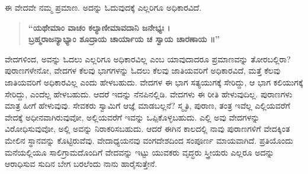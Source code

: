 ಈ ವೇದವೇ ನಮ್ಮ ಪ್ರಮಾಣ. ಅದನ್ನು ಓದುವುದಕ್ಕೆ ಎಲ್ಲರಿಗೂ ಅಧಿಕಾರವಿದೆ.

\vspace{-0.3cm}

\begin{verse}
\textbf{“ಯಥೇಮಾಂ ವಾಚಂ ಕಲ್ಯಾಣೀಮಾವದಾನಿ ಜನೇಭ್ಯಃ ।} \\
\textbf{ಬ್ರಹ್ಮರಾಜನ್ಯಾಭ್ಯಾಂ ಶೂದ್ರಾಯ ಚಾರ್ಯಾಯ ಚ ಸ್ವಾಯ ಚಾರಣಾಯ ॥”} 
\end{verse}

\vspace{-0.3cm}

{}



ವೇದಗಳಿಂದ, ಅವನ್ನು ಓದಲು ಎಲ್ಲರಿಗೂ ಅಧಿಕಾರವಿಲ್ಲ ಎಂಬ ಯಾವುದಾದರೂ ಪ್ರಮಾಣವನ್ನು ತೋರಬಲ್ಲಿರಾ? ಪುರಾಣಗಳೇನೋ, ವೇದಗಳ ಕೆಲವು ಭಾಗಗಳನ್ನು ಓದಲು ಕೆಲವು ಜಾತಿಯವರಿಗೆ ಅಧಿಕಾರವಿದೆ, ಮತ್ತೆ ಕೆಲವು ಜಾತಿಯವರಿಗೆ ಅಧಿಕಾರವಿಲ್ಲ ಎಂದು ಹೇಳಬಹುದು. ವೇದಗಳ ಈ ಭಾಗ ಸತ್ಯಯುಗಕ್ಕೆ ಸೇರಿದ್ದು, ಆ ಭಾಗ ಕಲಿಯುಗಕ್ಕೆ ಸೇರಿದ್ದು, ಎಂದೆಲ್ಲ ಹೇಳಬಹುದು. ಆದರೆ ಇದನ್ನು ನೆನಪಿನಲ್ಲಿಡಿ. ವೇದಗಳು ಈ ರೀತಿ ಹೇಳುವುದಿಲ್ಲ. ಪುರಾಣಗಳು ಮಾತ್ರ ಹೀಗೆ ಹೇಳುವುವು. ಸೇವಕರು ಸ್ವಾಮಿಗೆ ಆಜ್ಞೆ ಮಾಡಬಲ್ಲನೆ? ಸ್ಮೃತಿ, ಪುರಾಣ, ತಂತ್ರ ಇವೆಲ್ಲ ಎಲ್ಲಿಯವರೆಗೆ ವೇದಕ್ಕೆ ಅಧೀನವಾಗಿರುವುವೋ, ಅಲ್ಲಿಯವರೆಗೆ ಇವನ್ನು ಒಪ್ಪಿಕೊಳ್ಳಬಹುದು. ಎಲ್ಲಿ ಅವು ವೇದಗಳನ್ನು ವಿರೋಧಿಸುವುವೋ, ಅಲ್ಲಿ ಅವನ್ನು ನಿರಾಕರಿಸಬಹುದು. ಆದರೆ ಈಗಿನ ಕಾಲದಲ್ಲಿ ನಾವು ಪುರಾಣಗಳಿಗೆ ವೇದಕ್ಕಿಂತ ಮೇಲಿನ ಸ್ಥಾನವನ್ನು ಕೊಟ್ಟಿರುವೆವು. ವೇದಾಧ್ಯಯನವು ವಂಗದೇಶದಿಂದ ಸಂಪೂರ್ಣ ಮಾಯವಾಗಿದೆ. ಪ್ರತಿಯೊಂದು ಮನೆಯಲ್ಲಿಯೂ ಸಾಲಿಗ್ರಾಮದೊಂದಿಗೆ ವೇದವನ್ನು ಇಟ್ಟು ಯುವಕರು ವೃದ್ಧರು ಸ್ತ್ರೀಯರು ಎಲ್ಲರೂ ಅದನ್ನು ಆರಾಧಿಸುವ ಸುದಿನ ಬೇಗ ಬರಲೆಂದು ನಾನು ಹಾರೈಸುತ್ತೇನೆ.

\vskip 4pt

